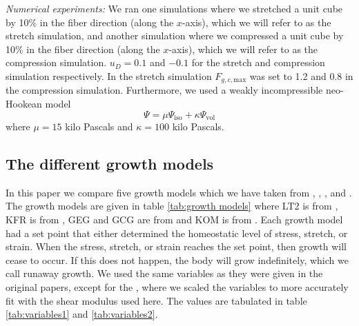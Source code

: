\emph{Numerical experiments:} We ran one simulations where we stretched a unit cube by 10\% in the fiber direction (along the $x$-axis), which we will refer to as the stretch simulation, and another simulation where we compressed a unit cube by 10\% in the fiber direction (along the $x$-axis), which we will refer to as the compression simulation. $u_D = 0.1$ and $-0.1$ for the stretch and compression simulation respectively. In the stretch simulation $F_{g,c,\mathrm{max}}$ was set to 1.2 and 0.8 in the compression simulation. Furthermore, we used a weakly incompressible neo-Hookean model
\begin{equation*}
    \Psi = \mu\Psi_\text{iso} + \kappa\Psi_\text{vol}
\end{equation*}
where $\mu = 15$ kilo Pascals and $\kappa = 100$ kilo Pascals.
\subsection{The different growth models}
\label{sub:different models} 
In this paper we compare five growth models which we have taken from \citep{Taber1998}, \citep{Kroon2009}, \citep{Goktepe}, and \citep{Kerckhoffs2012}. The growth models are given in table \ref{tab:growth models} where LT2 is from \citep{Taber1998}, KFR is from \citep{Kroon2009}, GEG and GCG are from \citep{Goktepe} and KOM is from \citep{Kerckhoffs2012}. Each growth model had a set point that either determined the homeostatic level of stress, stretch, or strain. When the stress, stretch, or strain reaches the set point, then growth will cease to occur. If this does not happen, the body will grow indefinitely, which we call runaway growth. We used the same variables as they were given in the original papers, except for the , where we scaled the variables to more accurately fit with the shear modulus used here. The values are tabulated in table \ref{tab:variables1} and \ref{tab:variables2}.
